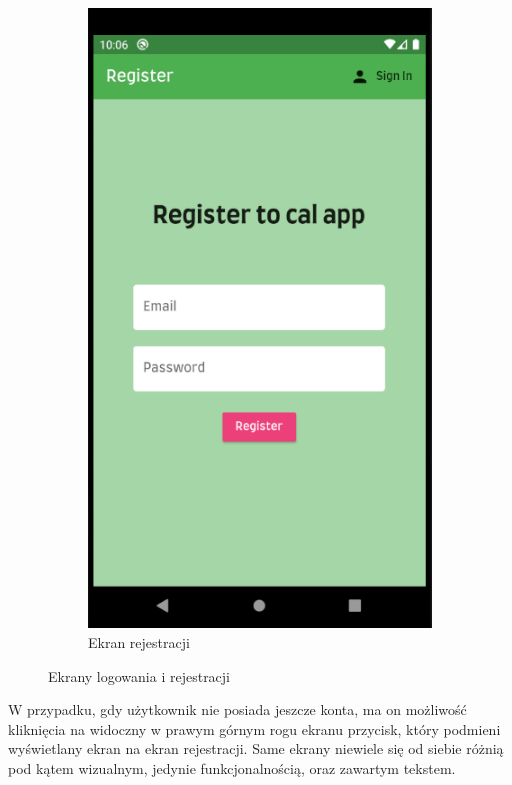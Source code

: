 \documentclass[12pt, a4paper]{article}
\begin{document}
\begin{sloppypar}
{{\begin{figure}[H]
\begin{subfigure}{.5\textwidth}
        \includegraphics[width=.8\linewidth]{screen_register.PNG}
        \caption{Ekran rejestracji}
        \label{fig:screen_register}
      \end{subfigure}
      \caption{Ekrany logowania i rejestracji}
      \label{fig:screens_login}
    \end{figure} 

    W przypadku, gdy użytkownik nie posiada jeszcze konta, ma on możliwość kliknięcia na
    widoczny w prawym górnym rogu ekranu przycisk, który podmieni wyświetlany ekran na ekran
    rejestracji. Same ekrany niewiele się od siebie różnią pod kątem wizualnym, jedynie
    funkcjonalnością, oraz zawartym tekstem.

}}
\end{sloppypar}
\end{document}
